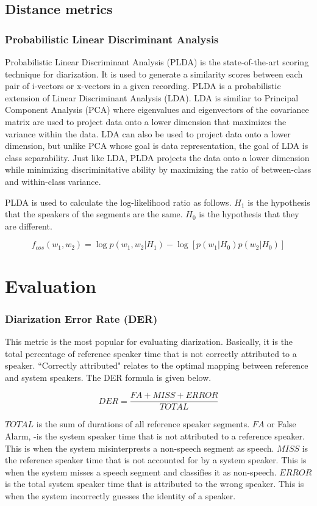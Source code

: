 	\subsection{Distance metrics}
		\subsubsection{Probabilistic Linear Discriminant Analysis}
		Probabilistic Linear Discriminant Analysis (PLDA) is the state-of-the-art scoring technique for diarization. It is used to generate a similarity scores between each pair of i-vectors or x-vectors in a given recording. PLDA is a probabilistic extension of Linear Discriminant Analysis (LDA). LDA is similiar to Principal Component Analysis (PCA) where eigenvalues and eigenvectors of the covariance matrix are used to project data onto a lower dimension that maximizes the variance within the data. LDA can also be used to project data onto a lower dimension, but unlike PCA whose goal is data representation, the goal of LDA is class separability. Just like LDA, PLDA projects the data onto a lower dimension while minimizing discriminitative ability by maximizing the ratio of between-class and within-class variance.
		
		PLDA is used to calculate the log-likelihood ratio as follows. $H_1$ is the hypothesis that the speakers of the segments are the same. $H_0$ is the hypothesis that they are different.
		
		$$ f_{cos}(w_1,w_2) =  \log p(w_1, w_2 | H_1) - \log [ p(w_1|H_0)  p(w_2|H_0) ] $$

\section{Evaluation}

	\subsubsection{Diarization Error Rate (DER)}
		This metric is the most popular for evaluating diarization. Basically, it is the total percentage of reference speaker time that is not correctly attributed to a speaker. ``Correctly attributed" relates to the optimal mapping between reference and system speakers. The DER formula is given below.
		
		$$ DER = \frac{FA + MISS + ERROR}{TOTAL} $$
		
		$TOTAL$ is the sum of durations of all reference speaker segments.
		$FA$ or False Alarm, -is the system speaker time that is not attributed to a reference speaker. This is when the system misinterprests a non-speech segment as speech.
		$MISS$ is the reference speaker time that is not accounted for by a system speaker. This is when the system misses a speech segment and classifies it as non-speech.
		$ERROR$ is the total system speaker time that is attributed to the wrong speaker. This is when the system incorrectly guesses the identity of a speaker.
		
